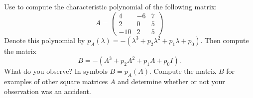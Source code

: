 \documentclass{ximera}
\begin{document}
\begin{exercise} \label{c10.2.10}
Use \Matlab to compute the characteristic polynomial of the following
matrix:
\[
A = \left( \begin{array}{rrr}
 4 & -6 & 7\\
 2 & 0 & 5\\
-10 & 2 & 5
\end{array} \right)
\]
Denote this polynomial by $p_A(\lambda) = 
-(\lambda^3 + p_2 \lambda^2 + p_1 \lambda + p_0)$.  Then compute
the matrix
\[
B = -(A^3 + p_2 A^2 + p_1 A + p_0 I).
\]
What do you observe?  In symbols $B=p_A(A)$.  Compute the matrix $B$ for
examples of other square matrices $A$ and determine whether or not 
your observation was an accident.
\end{exercise}
\end{document}
